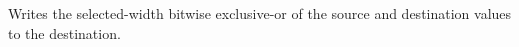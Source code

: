 Writes the selected-width bitwise exclusive-or of the source and destination values to the destination.
